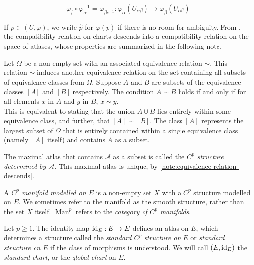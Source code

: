\documentclass[../main-manifolds.tex]{subfiles}
\begin{document}
\begin{equation}\label{def-transition-map}
    \varphi_{\beta}\circ\varphi_{\alpha}^{-1}=\varphi_{\beta\alpha^{-1}}: \varphi_{\alpha}(U_{\alpha\beta})\to\varphi_{\beta}(U_{\alpha\beta})
\end{equation}

If $p\in (U,\varphi)$, we write $\hat{p}$ for $\varphi(p)$ if there is no room for ambiguity. From , the compatibility relation on charts descends into a compatibility relation on the space of atlases, whose properties are summarized in the following note.

\begin{note}\label{note:equivalence-relation-descends}
    Let \( \Omega \) be a non-empty set with an associated equivalence relation \( \sim \). This relation \( \sim \) induces another equivalence relation on the set containing all subsets of equivalence classes from \( \Omega \). Suppose \( A \) and \( B \) are subsets of the equivalence classes \( [A] \) and \( [B] \) respectively. The condition \( A \sim B \) holds if and only if for all elements \( x \) in \( A \) and \( y \) in \( B \), \( x \sim y \).\\
    
     This is equivalent to stating that the union \( A \cup B \) lies entirely within some equivalence class, and further, that \( [A] \sim [B] \). The class \( [A] \) represents the largest subset of \( \Omega \) that is entirely contained within a single equivalence class (namely $[A]$ itself) and contains $A$ as a subset.
\end{note}

\begin{definition}\label{def:structure-of-manifold}
    The maximal atlas that contains $\mathcal{A}$ as a subset is called the \emph{$C^p$ structure determined by $\mathcal{A}$}. This maximal atlas is unique, by \cref{note:equivalence-relation-descends}.
\end{definition}
\begin{definition}[Manifold]\label{def:manifold}
    A \emph{$C^p$ manifold modelled on $E$} is a non-empty set $X$ with a $C^p$ structure modelled on $E$. We sometimes refer to the manifold as the smooth structure, rather than the set $X$ itself. $\operatorname{Man}^p$ refers to the \emph{category of $C^p$ manifolds}.
\end{definition}
\begin{wts}[$E$ is a manifold]\label{prop:banach-space-is-manifold}
    Let $p\geq 1$. The identity map $\operatorname{id}_{E}: E\to E$ defines an atlas on $E$, which determines a structure called the \emph{standard $C^p$ structure on $E$} or \emph{standard structure on $E$} if the class of morphisms is understood. We will call $(E,\operatorname{id}_{E})$ the \emph{standard chart}, or the \emph{global chart} on $E$.
\end{wts}
\end{document}
